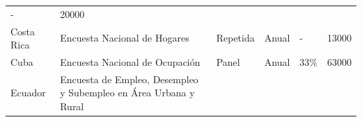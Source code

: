 \begin{longtable}[]{@{}llllll@{}}
\begin{minipage}[t]{0.06\columnwidth}
-\strut
\end{minipage} & \begin{minipage}[t]{0.13\columnwidth}\raggedright
20000\strut
\end{minipage}\tabularnewline
\begin{minipage}[t]{0.13\columnwidth}\raggedright
Costa Rica\strut
\end{minipage} & \begin{minipage}[t]{0.38\columnwidth}\raggedright
Encuesta Nacional de Hogares\strut
\end{minipage} & \begin{minipage}[t]{0.06\columnwidth}\raggedright
Repetida\strut
\end{minipage} & \begin{minipage}[t]{0.08\columnwidth}\raggedright
Anual\strut
\end{minipage} & \begin{minipage}[t]{0.06\columnwidth}\raggedright
-\strut
\end{minipage} & \begin{minipage}[t]{0.13\columnwidth}\raggedright
13000\strut
\end{minipage}\tabularnewline
\begin{minipage}[t]{0.13\columnwidth}\raggedright
Cuba\strut
\end{minipage} & \begin{minipage}[t]{0.38\columnwidth}\raggedright
Encuesta Nacional de Ocupación\strut
\end{minipage} & \begin{minipage}[t]{0.06\columnwidth}\raggedright
Panel\strut
\end{minipage} & \begin{minipage}[t]{0.08\columnwidth}\raggedright
Anual\strut
\end{minipage} & \begin{minipage}[t]{0.06\columnwidth}\raggedright
33\%\strut
\end{minipage} & \begin{minipage}[t]{0.13\columnwidth}\raggedright
63000\strut
\end{minipage}\tabularnewline
\begin{minipage}[t]{0.13\columnwidth}\raggedright
Ecuador\strut
\end{minipage} & \begin{minipage}[t]{0.38\columnwidth}\raggedright
Encuesta de Empleo, Desempleo y Subempleo en Área Urbana y Rural\strut
\end{minipage} & \begin{minipage}[t]{0.06\columnwidth}\raggedright

\end{minipage}
\end{longtable}
